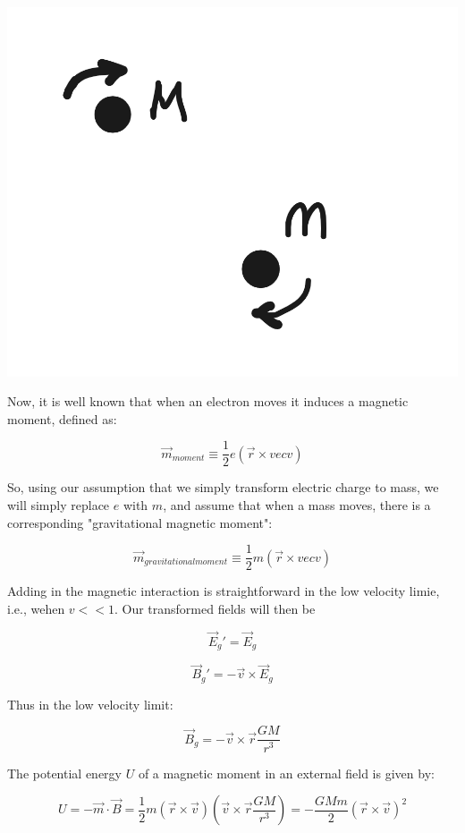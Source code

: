 \documentclass {article}
\begin{document}
\begin{center}
	\includegraphics[scale=0.1]{autodraw.png}
\end{center}

Now, it is well known that when an electron moves it induces a magnetic moment, defined as:

$$\vec m_{moment} \equiv \frac 1 {2} e (\vec r \times vec v)$$

So, using our assumption that we simply transform electric charge to mass, we will simply replace $e$ with $m$, and assume that when a mass moves, there is a corresponding "gravitational magnetic moment":

$$\vec m_{gravitational moment} \equiv \frac 1 {2} m (\vec r \times vec v)$$

Adding in the magnetic interaction is straightforward in the low velocity limie, i.e., wehen $v << 1$. Our transformed fields will then be

$$\vec E_g' = \vec E_g$$

$$ \vec B_g' = - \vec v \times \vec E_g$$

Thus in the low velocity limit:

$$\vec B_g = - \vec v \times \vec r \frac {GM} {r^3} $$ 

The potential energy $U$ of a magnetic moment in an external field is given by:

$$U = - \vec m \cdot \vec B = \frac 1 2 m (\vec r \times \vec v)\left(\vec v \times \vec r \frac {GM} {r^3} \right) = - \frac {GMm} 2 (\vec r \times \vec v)^2$$
\end{document}
